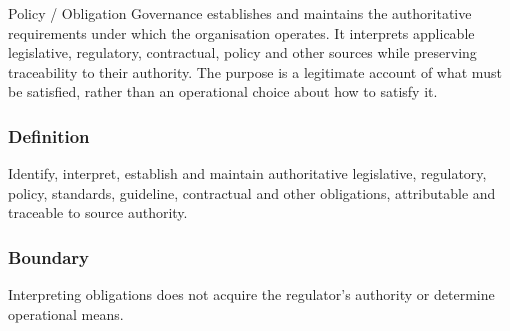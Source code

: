 Policy /\allowbreak{} Obligation Governance establishes and maintains the authoritative requirements under which the organisation operates. It interprets applicable legislative, regulatory, contractual, policy and other sources while preserving traceability to their authority. The purpose is a legitimate account of what must be satisfied, rather than an operational choice about how to satisfy it.

\subsubsection*{Definition}

Identify, interpret, establish and maintain authoritative legislative, regulatory, policy, standards, guideline, contractual and other obligations, attributable and traceable to source authority.

\subsubsection*{Boundary}

Interpreting obligations does not acquire the regulator's authority or determine operational means.

